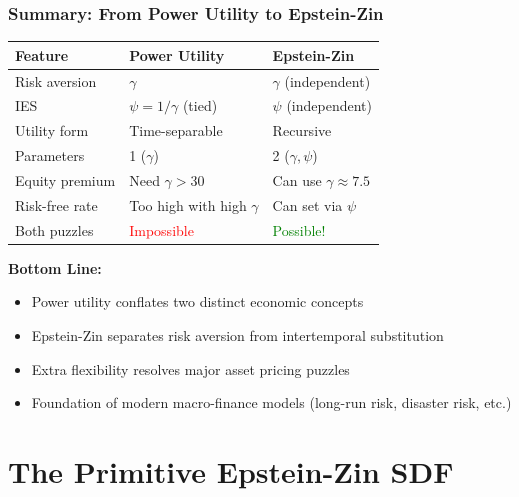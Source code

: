 \documentclass{beamer}
\begin{document}
\begin{frame}
    \frametitle{Summary: From Power Utility to Epstein-Zin}
    
    \begin{table}
        \footnotesize
        \begin{tabular}{p{3cm}|p{3.5cm}|p{3.5cm}}
            \toprule
            \textbf{Feature} & \textbf{Power Utility} & \textbf{Epstein-Zin} \\
            \midrule
            Risk aversion & $\gamma$ & $\gamma$ (independent) \\[0.2cm]
            IES & $\psi = 1/\gamma$ (tied) & $\psi$ (independent) \\[0.2cm]
            Utility form & Time-separable & Recursive \\[0.2cm]
            Parameters & 1 ($\gamma$) & 2 ($\gamma, \psi$) \\[0.2cm]
            Equity premium & Need $\gamma > 30$ & Can use $\gamma \approx 7.5$ \\[0.2cm]
            Risk-free rate & Too high with high $\gamma$ & Can set via $\psi$ \\[0.2cm]
            Both puzzles & \textcolor{red}{Impossible} & \textcolor{green}{Possible!} \\
            \bottomrule
        \end{tabular}
    \end{table}
    
    
    \textbf{Bottom Line:}
    \begin{itemize}
        \item Power utility conflates two distinct economic concepts
        \item Epstein-Zin separates risk aversion from intertemporal substitution
        \item Extra flexibility resolves major asset pricing puzzles
        \item Foundation of modern macro-finance models (long-run risk, disaster risk, etc.)
    \end{itemize}
\end{frame}

\section{The Primitive Epstein-Zin SDF}
\end{document}
